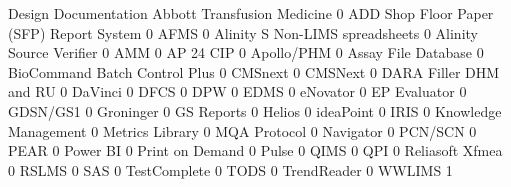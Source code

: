 \documentclass{article}
\begin{document}
\begin{Schunk}
\begin{Soutput}
                                           Design Documentation
  Abbott Transfusion Medicine                                 0
  ADD Shop Floor Paper (SFP) Report System                    0
  AFMS                                                        0
  Alinity S Non-LIMS spreadsheets                             0
  Alinity Source Verifier                                     0
  AMM                                                         0
  AP 24 CIP                                                   0
  Apollo/PHM                                                  0
  Assay File Database                                         0
  BioCommand Batch Control Plus                               0
  CMSnext                                                     0
  CMSNext                                                     0
  DARA Filler DHM and RU                                      0
  DaVinci                                                     0
  DFCS                                                        0
  DPW                                                         0
  EDMS                                                        0
  eNovator                                                    0
  EP Evaluator                                                0
  GDSN/GS1                                                    0
  Groninger                                                   0
  GS Reports                                                  0
  Helios                                                      0
  ideaPoint                                                   0
  IRIS                                                        0
  Knowledge Management                                        0
  Metrics Library                                             0
  MQA Protocol                                                0
  Navigator                                                   0
  PCN/SCN                                                     0
  PEAR                                                        0
  Power BI                                                    0
  Print on Demand                                             0
  Pulse                                                       0
  QIMS                                                        0
  QPI                                                         0
  Reliasoft Xfmea                                             0
  RSLMS                                                       0
  SAS                                                         0
  TestComplete                                                0
  TODS                                                        0
  TrendReader                                                 0
  WWLIMS                                                      1
                                          

\end{Soutput}
\end{Schunk}
\end{document}
